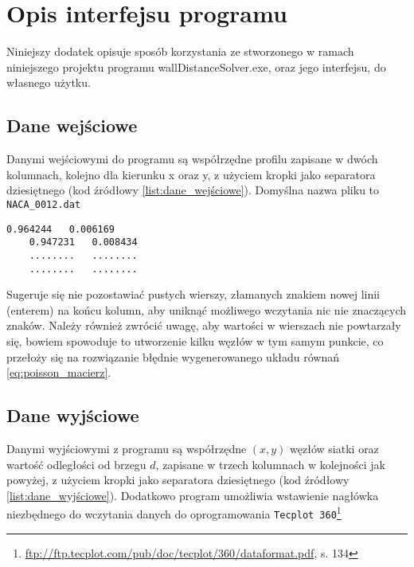 \chapter{Opis interfejsu programu}

\indent\indent Niniejszy dodatek opisuje sposób korzystania ze stworzonego w ramach niniejszego projektu programu \textsf{wallDistanceSolver.exe}, oraz jego interfejsu, do własnego użytku.

\section{Dane wejściowe}

\indent\indent Danymi wejściowymi do programu są współrzędne profilu zapisane w dwóch kolumnach, kolejno dla kierunku x oraz y, z użyciem kropki jako separatora dziesiętnego (kod źródłowy \ref{list:dane_wejściowe}). Domyślna nazwa pliku to \texttt{\mbox{NACA\_0012.dat}}

\begin{lstlisting}[label=list:dane_wejściowe,caption=Format zapisu danych wejściowych]
	0.964244   0.006169
	0.947231   0.008434
	........   ........
	........   ........	
\end{lstlisting}

\noindent\newline Sugeruje się nie pozostawiać pustych wierszy, złamanych znakiem nowej linii (enterem) na końcu kolumn, aby uniknąć możliwego wczytania nic nie znaczących znaków. Należy również zwrócić uwagę, aby wartości w wierszach nie powtarzały się, bowiem spowoduje to utworzenie kilku węzłów w tym samym punkcie, co przełoży się na rozwiązanie błędnie wygenerowanego układu równań \ref{eq:poisson_macierz}.   

\section{Dane wyjściowe}

\indent\indent Danymi wyjściowymi z programu są współrzędne $(x,y)$ węzłów siatki oraz wartość odległości od brzegu $d$, zapisane w trzech kolumnach w kolejności jak powyżej, z użyciem kropki jako separatora dziesiętnego (kod źródłowy \ref{list:dane_wyjściowe}). Dodatkowo program umożliwia wstawienie nagłówka niezbędnego do wczytania danych do oprogramowania \texttt{Tecplot 360}\footnote{\url{ftp://ftp.tecplot.com/pub/doc/tecplot/360/dataformat.pdf}, s. 134}

